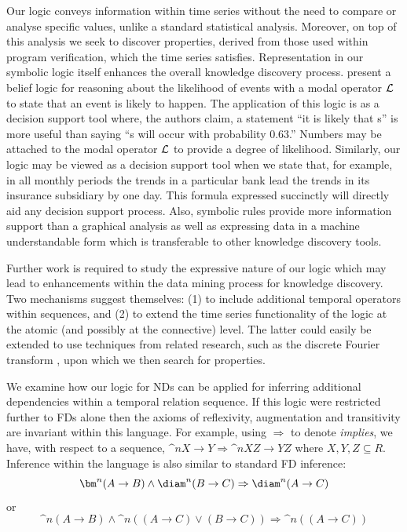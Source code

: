 Our logic conveys information within time series without the need to
compare or analyse specific values, unlike a standard statistical
analysis. Moreover, on top of this analysis we seek to discover
properties, derived from those used within program verification, which
the time series satisfies. Representation in our
symbolic logic itself enhances the overall knowledge discovery
process. \cite{hr83} present a belief logic for reasoning about the
likelihood of events with a modal operator ${\cal L}$ to state that an
event is likely to happen.  The application of this logic is as a
decision support tool where, the authors claim, a statement ``it is
likely that s'' is more useful than saying ``s will occur with
probability 0.63.'' Numbers may be attached to the modal operator
${\cal L}$ to provide a degree of likelihood. Similarly, our logic may
be viewed as a decision support tool when we state that, for example,
in all monthly periods the trends in a particular bank lead the trends
in its insurance subsidiary by one day. This formula expressed
succinctly will directly aid any decision support process. Also,
symbolic rules provide more information support than a graphical
analysis as well as expressing data in a machine understandable form
which is transferable to other knowledge discovery tools.

\medskip

Further work is required to study the expressive nature of our logic
which may lead to enhancements within the data mining process for
knowledge discovery. Two mechanisms suggest themselves: (1) to include
additional temporal operators within sequences, and (2) to extend the
time series functionality of the logic at the atomic (and possibly at
the connective) level. The latter could easily be extended to use
techniques from related research, such as the discrete Fourier
transform \cite{alss95,dgm97,raf99}, upon which we then search for properties.

\medskip

We examine how our logic for NDs can be applied for
inferring additional dependencies within a temporal relation sequence.
If this logic were restricted further to FDs
alone
then the axioms of reflexivity, augmentation and transitivity are
invariant within this language. For example, using $\Rightarrow$ to denote
{\em implies}, we have, with respect to a sequence, 
$\bm^n X \to Y \Rightarrow \bm^n XZ \to YZ$ where $X,Y,Z \subseteq R$. Inference
within the language is also similar to standard FD inference: 
\begin{displaymath}
\bm^n (A \to B) \wedge \mbox{\diam}^n (B \to C) \Rightarrow
\mbox{\diam}^n (A \to C) 
\end{displaymath} or
\begin{displaymath}
\bm^n (A \to B) \wedge \bm^n ((A \to C) \vee (B \to C)) \Rightarrow
\bm^n ((A \to C)) 
\end{displaymath}

